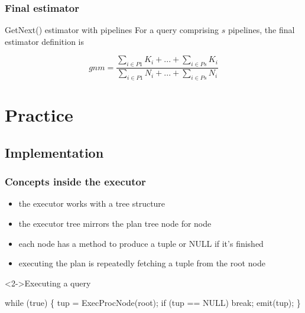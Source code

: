 \documentclass{beamer}
\begin{document}
\begin{frame}
  \frametitle{Final estimator}

  \begin{block}{GetNext() estimator with pipelines}
    For a query comprising $s$ pipelines, the final estimator definition is

    \begin{equation*}
      gnm = \frac{\sum\limits_{i \in P1} K_{i} + ... + \sum\limits_{i \in Ps} K_{i}}
      {\sum\limits_{i \in P1} N_{i} + ... + \sum\limits_{i \in Ps} N_{i}}
    \end{equation*}
  \end{block}
\end{frame}

\section{Practice}
\subsection{Implementation}

\begin{frame}[fragile]
  \frametitle{Concepts inside the executor}

  \begin{itemize}
  \item the executor works with a tree structure
  \item the executor tree mirrors the plan tree node for node
  \item each node has a method to produce a tuple or NULL if it's finished
  \item executing the plan is repeatedly fetching a tuple from the root node
  \end{itemize}

  \begin{block}<2->{Executing a query}
    \begin{semiverbatim}
      while (true) \{
          tup = ExecProcNode(root);
          if (tup == NULL)
              break;
          emit(tup);
      \}
    \end{semiverbatim}
  \end{block}
\end{frame}
\end{document}

